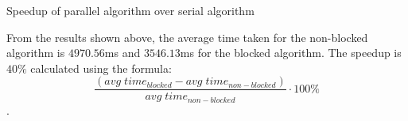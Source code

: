 \documentclass[12pt]{article}
\begin{document}
\begin{section}{Speedup of parallel algorithm over serial algorithm}

 From the results shown above, the average time taken for the non-blocked algorithm is $4970.56$ms and $3546.13$ms for the blocked algorithm.
 The speedup is $40\%$ calculated using the formula: $$\frac{(avg\;time_{blocked} - avg\;time_{non-blocked})}{avg\;time_{non-blocked}} \cdot 100\%$$.
\end{section}
\end{document}
